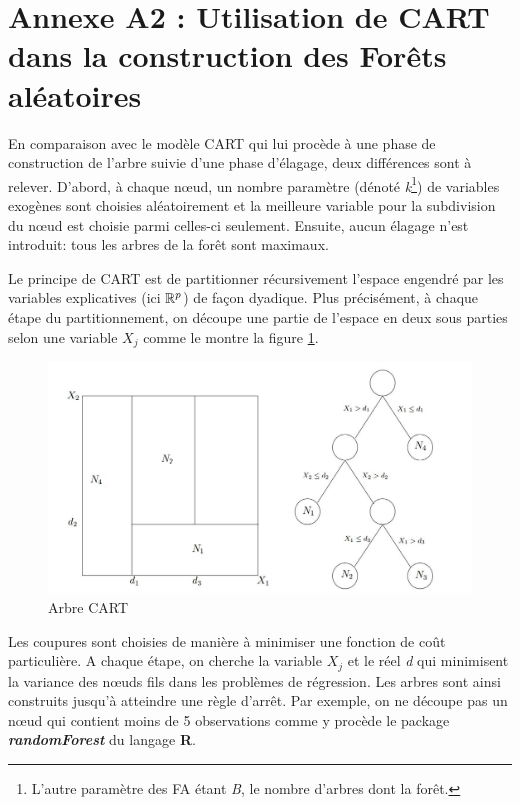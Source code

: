 	\chapter*{Annexe A2 : Utilisation de CART dans la construction des Forêts aléatoires}
En comparaison avec le modèle CART qui lui procède à une phase de construction de l'arbre suivie d'une phase d'élagage, deux différences sont à relever. D'abord, à chaque nœud, un nombre paramètre (dénoté \textit{k}\footnote{L'autre paramètre des FA étant \textit{B}, le nombre d'arbres dont la forêt.}) de variables exogènes sont choisies aléatoirement et la meilleure variable pour la subdivision du nœud est choisie parmi celles-ci seulement. Ensuite, aucun élagage n'est introduit: tous les arbres de la forêt sont maximaux.\par
	Le principe de CART est de partitionner récursivement l’espace engendré par les variables explicatives (ici $\mathbb{R}^p$) de façon dyadique. Plus précisément, à
	chaque étape du partitionnement, on découpe une partie de l’espace en deux sous parties selon une variable $X_j$ comme le montre la figure \ref{fig:CART}.
	\begin{figure}[h]
	    		\centering
	    		\includegraphics[scale=0.35]{Cart}
	    		\caption{Arbre CART}
	    		\label{fig:CART}
	\end{figure}
	\par
	Les coupures sont choisies de manière à minimiser une fonction de coût particulière. A chaque étape, on cherche la variable $X_j$ et le réel \textit{d} qui minimisent la variance des nœuds fils dans les problèmes de régression. Les arbres sont ainsi construits jusqu’à atteindre une règle d’arrêt. Par exemple, on ne découpe pas un nœud qui contient moins de 5 observations comme y procède le package \textbf{\textit{randomForest}} du langage \textbf{R}.\par
